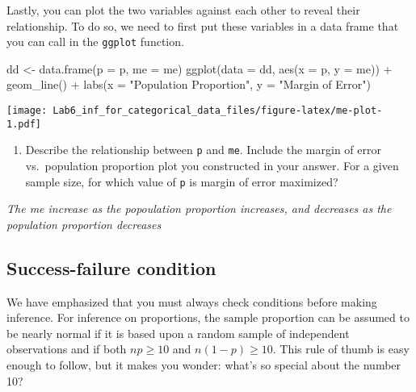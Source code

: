 \documentclass[
]{article}
\newenvironment{Shaded}{\begin{snugshade}}{\end{snugshade}}
\newcommand{\AttributeTok}[1]{\textcolor[rgb]{0.77,0.63,0.00}{#1}}
\newcommand{\FunctionTok}[1]{\textcolor[rgb]{0.00,0.00,0.00}{#1}}
\newcommand{\NormalTok}[1]{#1}
\newcommand{\OtherTok}[1]{\textcolor[rgb]{0.56,0.35,0.01}{#1}}
\newcommand{\SpecialCharTok}[1]{\textcolor[rgb]{0.00,0.00,0.00}{#1}}
\newcommand{\StringTok}[1]{\textcolor[rgb]{0.31,0.60,0.02}{#1}}
\providecommand{\tightlist}{%
  \setlength{\itemsep}{0pt}\setlength{\parskip}{0pt}}
\begin{document}
Lastly, you can plot the two variables against each other to reveal
their relationship. To do so, we need to first put these variables in a
data frame that you can call in the \texttt{ggplot} function.

\begin{Shaded}
\begin{Highlighting}[]
\NormalTok{dd }\OtherTok{\textless{}{-}} \FunctionTok{data.frame}\NormalTok{(}\AttributeTok{p =}\NormalTok{ p, }\AttributeTok{me =}\NormalTok{ me)}
\FunctionTok{ggplot}\NormalTok{(}\AttributeTok{data =}\NormalTok{ dd, }\FunctionTok{aes}\NormalTok{(}\AttributeTok{x =}\NormalTok{ p, }\AttributeTok{y =}\NormalTok{ me)) }\SpecialCharTok{+} 
  \FunctionTok{geom\_line}\NormalTok{() }\SpecialCharTok{+}
  \FunctionTok{labs}\NormalTok{(}\AttributeTok{x =} \StringTok{"Population Proportion"}\NormalTok{, }\AttributeTok{y =} \StringTok{"Margin of Error"}\NormalTok{)}
\end{Highlighting}
\end{Shaded}

\texttt{[image: Lab6\_inf\_for\_categorical\_data\_files/figure-latex/me-plot-1.pdf]}

\begin{enumerate}
\def\labelenumi{\arabic{enumi}.}
\setcounter{enumi}{4}
\tightlist
\item
  Describe the relationship between \texttt{p} and \texttt{me}. Include
  the margin of error vs.~population proportion plot you constructed in
  your answer. For a given sample size, for which value of \texttt{p} is
  margin of error maximized?
\end{enumerate}

\emph{The me increase as the popoulation proportion increases, and
decreases as the population proportion decreases}

\hypertarget{success-failure-condition}{%
\subsection{Success-failure condition}\label{success-failure-condition}}

We have emphasized that you must always check conditions before making
inference. For inference on proportions, the sample proportion can be
assumed to be nearly normal if it is based upon a random sample of
independent observations and if both \(np \geq 10\) and
\(n(1 - p) \geq 10\). This rule of thumb is easy enough to follow, but
it makes you wonder: what's so special about the number 10?
\end{document}
